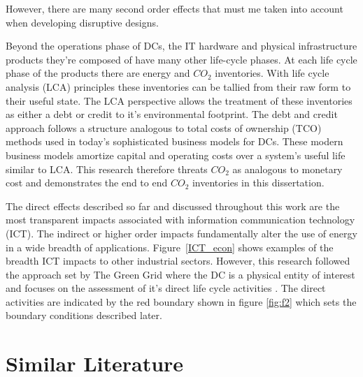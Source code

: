     
    
    However, there are many second order effects that must me taken into account when developing disruptive designs.
    
    
    
    Beyond the operations phase of DCs, the IT hardware and physical infrastructure products they're composed of have many other life-cycle phases. At each life cycle phase of the products there are energy and $CO_2$ inventories. With life cycle analysis (LCA) principles these inventories can be tallied from their raw form to their useful state.  The LCA perspective allows the treatment of these inventories as either a debt or credit to it's environmental footprint. The debt and credit approach follows a structure analogous to total costs of ownership (TCO) methods used in today's sophisticated business models for DCs. These modern business models amortize capital and operating costs over a system's useful life similar to LCA. This research therefore threats $CO_2$ as analogous to monetary cost and demonstrates the end to end $CO_2$ inventories in this dissertation.
    
    The direct effects described so far and discussed throughout this work are the most transparent impacts associated with information communication technology (ICT). The indirect or higher order impacts fundamentally alter the use of energy in a wide breadth of applications. Figure~\ref{ICT_econ} shows examples of the breadth ICT impacts to other industrial sectors. However, this research followed the approach set by The Green Grid where the DC is a physical entity of interest and focuses on the assessment of it's direct life cycle activities \cite{tgg12}. The direct activities are indicated by the red boundary shown in figure  \ref{fig:f2} which sets the boundary conditions described later. 
    
    
    
\section{Similar Literature}
    

